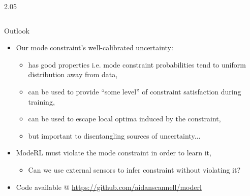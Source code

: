 \documentclass[final,12pt]{beamer}
\newlength{\sepwidth}
\newlength{\colwidth}
\newcommand{\separatorcolumn}{\begin{column}{\sepwidth}\end{column}}
\begin{document}
\begin{frame}[t]
\begin{columns}[t]
\begin{column}{2.05\colwidth}
\begin{columns}[t]
\begin{column}{\colwidth}
\begin{block}{Outlook}
  \begin{itemize}
    \item Our mode constraint's well-calibrated uncertainty:
    \begin{itemize}
      \item has good properties i.e. mode constraint probabilities tend to uniform distribution away from data,
      \item can be used to provide ``some level'' of constraint satisfaction during training,
      \item can be used to escape local optima induced by the constraint,
      \item but important to disentangling sources of uncertainty...
    \end{itemize}
    \item \alert{ModeRL} must violate the mode constraint in order to learn it,
    \begin{itemize}
      \item Can we use external sensors to infer constraint without violating it?
    \end{itemize}
    \item Code available @ \url{https://github.com/aidanscannell/moderl}
  \end{itemize}

  \end{block}

  \vspace*{1em}



\end{column}

\end{columns}

\end{column}

\separatorcolumn

\end{columns}

\end{frame}
\end{document}
